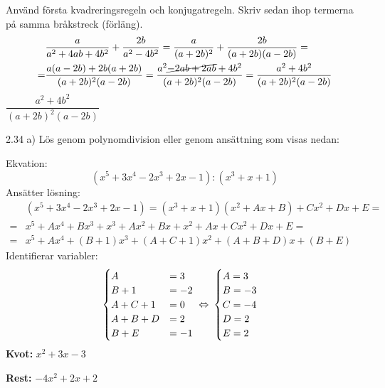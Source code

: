 \begin{task}{2.33}
	Använd första kvadreringsregeln och konjugatregeln. Skriv sedan ihop termerna på samma bråkstreck (förläng).
	\begin{align*}
	&\frac{a}{a^2+4ab+4b^2}+\frac{2b}{a^2-4b^2}=
	\frac{a}{(a+2b)^2}+\frac{2b}{(a+2b)(a-2b)}= \\ =
	&\frac{a(a-2b)+2b(a+2b)}{(a+2b)^2(a-2b)}=
	\frac{a^2\cancel{-2ab+2ab}+4b^2}{(a+2b)^2(a-2b)}=
	\frac{a^2+4b^2}{(a+2b)^2(a-2b)}
	\end{align*}
	\ans $\dfrac{a^2+4b^2}{(a+2b)^2(a-2b)}$
\end{task}

\begin{task}{2.34 a)}
	Lös genom polynomdivision eller genom ansättning som visas nedan:
	
	Ekvation:
	\[(x^5+3x^4-2x^3+2x-1):(x^3+x+1)\]
	Ansätter lösning:
	\begin{align*}
	&(x^5+3x^4-2x^3+2x-1)=(x^3+x+1)(x^2+Ax+B)+Cx^2+Dx+E= \\ =
	&x^5+Ax^4+Bx^3+x^3+Ax^2+Bx+x^2+Ax+Cx^2+Dx+E= \\ =
	&x^5+Ax^4+(B+1)x^3+(A+C+1)x^2+(A+B+D)x+(B+E)
	\end{align*}
	Identifierar variabler:
	\[\begin{cases}
	A&=3 \\
	B+1&=-2 \\
	A+C+1&=0 \\
	A+B+D&=2 \\
	B+E&=-1
	\end{cases}
	\lra
	\begin{cases}
	A=3 \\
	B=-3 \\
	C=-4 \\
	D=2 \\
	E=2
	\end{cases}\]
	\textbf{Kvot:} $x^2+3x-3$
	
	\textbf{Rest:} $-4x^2+2x+2$
\end{task}

